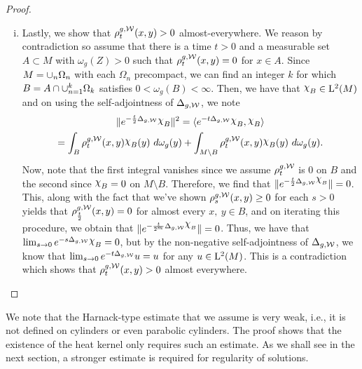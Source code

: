 \documentclass[a4paper, 12pt]{amsart}
\begin{document}
\begin{proof}
\begin{enumerate}[(i)]
\item Lastly, we show that $\rho^{g,\mathcal{W}}_t(x,y) > 0$  almost-everywhere.
	We reason by contradiction so assume that there
	is a time $t > 0$ and a measurable set $A \subset M$ with $\omega_g(Z) > 0$
	such that $\rho^{g,\mathcal{W}}_t(x,y) = 0$ for $x \in A$.
	Since $M = \cup_{n} \Omega_n$ with each 
	$\Omega_n$ precompact, we can find an integer
	$k$ for which $B = A \cap \cup_{n=1}^k \Omega_k$ 
	satisfies $0 < \omega_g(B) < \infty$. Then,
	we have that $\ind{B} \in \Lp{2}(M)$ and 
	on using the self-adjointness of $\Delta_{g,\mathcal{W}}$,
	we note
	\begin{multline*}  
	\norm{e^{-\frac{t}{2} \Delta_{g,\cW}}\ind{B}}^2 
		 = \inprod{e^{-t \Delta_{g,\cW}} \ind{B},\ind{B}} \\
		= \int_{B} \hk^{g,\cW}_t(x,y)\ind{B}(y)\ d\omega_g(y) + 
			\int_{M \setminus B} \hk^{g,\cW}_t(x,y)\ind{B}(y)\ d\omega_g(y).
	\end{multline*}
	Now, note that the first integral vanishes
	since we assume $\rho^{g,\mathcal{W}}_t$ is $0$ on $B$
	and the second since $\ind{B} = 0$ on $M \setminus B$.
	Therefore, we find that $\norm{e^{-\frac{t}{2} \Delta_{g,\cW} \ind{B}}} = 0$.
	This, along with the fact that we've shown $\rho^{g,\mathcal{W}}_s(x,y) \geq 0$ 
	for each $s > 0$ yields that $\rho^{g,\mathcal{W}}_{\frac{t}{2}}(x,y) = 0$ for 
	almost every $x,\ y \in B$, and on 
	iterating this procedure, we obtain that
	$\norm{e^{-\frac{t}{2^m} \Delta_{g,\cW} \ind{B}}} = 0$.
	Thus, we have that $\lim_{s\to 0} e^{-s \Delta_{g,\cW}} \ind{B} = 0$, 
	but by the non-negative self-adjointness of
	$\Delta_{g,\mathcal{W}}$, we know that $\lim_{s \to 0} e^{-t \Delta_{g,\mathcal{W}}} u = u$
	for any $u \in {\rm L}^{2}_{\rm {}}(M)$.  This is a contradiction
	which shows that $\rho^{g,\mathcal{W}}_t(x,y) > 0$ almost everywhere.
\end{enumerate} 
\end{proof}

\begin{rem}
We note that the Harnack-type estimate that we assume is very 
weak, i.e., it is not defined on cylinders or even 
parabolic cylinders. The proof shows that the existence 
of the heat kernel only requires such an estimate. 
As we shall see in the next section, a stronger
estimate is required for regularity of solutions. 
\end{rem}
\end{document}
